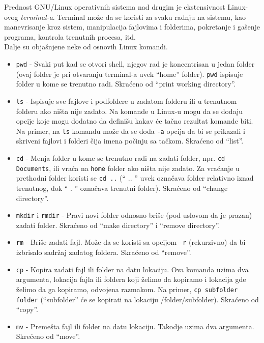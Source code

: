Prednost GNU/Linux operativnih sistema nad drugim je ekstensivnost Linux-ovog \textit{terminal-a}. Terminal može da se koristi za svaku radnju na sistemu, kao manevrisanje kroz sistem, manipulacija fajlovima i folderima,  pokretanje i gašenje programa, kontrola trenutnih procesa, itd.\\
Dalje su objašnjene neke od osnovih Linux komandi.
\begin{itemize}
\item \texttt{pwd} - Svaki put kad se otvori shell, njegov rad je koncentrisan u jedan folder (ovaj folder je pri otvaranju terminal-a uvek ``home'' folder). \texttt{pwd} ispisuje folder u kome se trenutno radi. Skraćeno od ``print working directory''. 

\item \texttt{ls} - Ispisuje sve fajlove i podfoldere u zadatom folderu ili u trenutnom folderu ako ništa nije zadato. Na komande u Linux-u mogu da se dodaju opcije koje mogu dodatno da definišu kakav će tačno rezultat komande biti. Na primer, na \texttt{ls} komandu može da se doda \texttt{-a} opcija da bi se prikazali i skriveni fajlovi i folderi čija imena počinju sa tačkom. Skraćeno od ``list''.

\item \texttt{cd} - Menja folder u kome se trenutno radi na zadati folder, npr. \texttt{cd Documents}, ili vraća na \texttt{home} folder ako ništa nije zadato. Za vraćanje u prethodni folder koristi se \texttt{cd ..} (`` .. '' uvek označava folder relativno iznad trenutnog, dok `` . '' označava trenutni folder). Skraćeno od ``change directory''.

\item \texttt{mkdir} i \texttt{rmdir} - Pravi novi folder odnosno briše (pod uslovom da je prazan) zadati folder. Skraćeno od ``make directory'' i ``remove directory''.

\item \texttt{rm} - Briše zadati fajl. Može da se koristi sa opcijom \texttt{-r} (rekurzivno) da bi izbrisalo sadržaj zadatog foldera. Skraćeno od ``remove''.

\item \texttt{cp} - Kopira zadati fajl ili folder na datu lokaciju. Ova komanda uzima dva argumenta, lokacija fajla ili foldera koji želimo da kopiramo i lokacija gde želimo da ga kopiramo, odvojena razmakom. Na primer, \texttt{cp subfolder folder} (``subfolder'' će se kopirati na lokaciju /folder/subfolder). Skraćeno od ``copy''.

\item \texttt{mv} - Premešta fajl ili folder na datu lokaciju. Takodje uzima dva argumenta. Skrećeno od ``move''.


\end{itemize}
